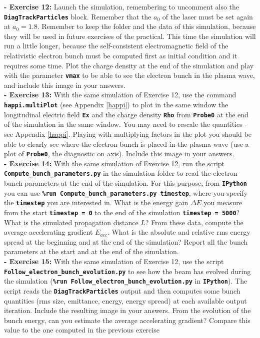 \documentclass[a4paper,12pt]{extarticle}
\newcommand{\commandline}[1]{\texttt{\textbf{#1}}}
\begin{document}
\textbf{ - Exercise 12:} Launch the simulation, remembering to uncomment also the \commandline{DiagTrackParticles} block. Remember that the $a_0$ of the laser must be set again at $a_0=1.8$.  Remember to keep the folder and the data of this simulation, because they will be used in future exercises of the practical. This time the simulation will run a little longer, because the self-consistent electromagnetic field of the relativistic electron bunch must be computed first as initial condition and it requires some time. Plot the charge density at the end  of the simulation and play with the parameter \commandline{vmax} to be able to see the electron bunch in the plasma wave, and include this image in your answers.\\

\textbf{ - Exercise 13:} With the same simulation of Exercise 12, use the command \commandline{happi.multiPlot} (see Appendix \ref{happi}) to plot in the same window the longitudinal electric field \commandline{Ex} and the charge density \commandline{Rho} from \commandline{Probe0} at the end of the simulation in the same window. You may need to rescale the quantities - see Appendix \ref{happi}. Playing with multiplying factors in the plot you should be able to clearly see where the electron bunch is placed in the plasma wave (use a plot of \commandline{Probe0}, the diagnostic on axis). Include this image in your answers.\\

\textbf{ - Exercise 14:} With the same simulation of Exercise 12, run the script \commandline{Compute\_bunch\_parameters.py} in the simulation folder to read the electron bunch parameters at the end of the simulation. For this purpose, from \commandline{IPython} you can use \commandline{\%run Compute\_bunch\_parameters.py timestep}, where you specify the \commandline{timestep} you are interested in. What is the energy gain $\Delta E$ you measure from the start \commandline{timestep = 0} to the end of the simulation \commandline{timestep = 5000}? What is the simulated propagation distance $L$? From these data, compute the average accelerating  gradient $E_{acc}$. What is the absolute and relative rms energy spread at the beginning and at the end of the simulation? Report all the bunch parameters at the start and at the end of the simulation.\\

\textbf{ - Exercise 15:} With the same simulation of Exercise 12, use the script
 \commandline{Follow\_electron\_bunch\_evolution.py} to see how the beam has evolved during the simulation (\commandline{\%run Follow\_electron\_bunch\_evolution.py} in \commandline{IPython}).  The script reads the \commandline{DiagTrackParticles} output and then computes some bunch quantities (rms size, emittance, energy, energy spread) at each available output iteration. Include the resulting image in your answers.  From the evolution of the bunch energy, can you estimate the average accelerating gradient? Compare this value to the one computed in the previous exercise\\
\end{document}
